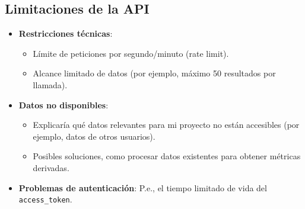 




\subsection{Limitaciones de la API}
\begin{itemize}
    \item \textbf{Restricciones técnicas}:
          \begin{itemize}
              \item Límite de peticiones por segundo/minuto (rate limit).
              \item Alcance limitado de datos (por ejemplo, máximo 50 resultados por llamada).
          \end{itemize}
    \item \textbf{Datos no disponibles}:
          \begin{itemize}
              \item Explicaría qué datos relevantes para mi proyecto no están accesibles (por ejemplo, datos de otros usuarios).
              \item Posibles soluciones, como procesar datos existentes para obtener métricas derivadas.
          \end{itemize}
    \item \textbf{Problemas de autenticación}: P.e., el tiempo limitado de vida del \texttt{access\_token}.
\end{itemize}

